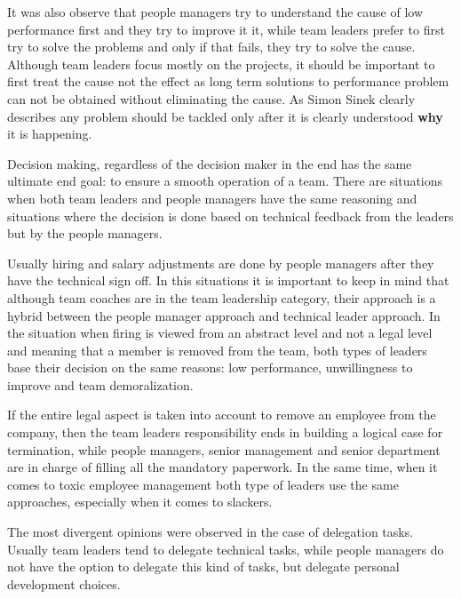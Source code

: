 It was also observe that people managers try to understand the cause of low performance first and they try to improve it it, while team leaders prefer to first try to solve the problems and only if that fails, they try to solve the cause. Although team leaders focus mostly on the projects, it should be important to first treat the cause not the effect as long term solutions to performance problem can not be obtained without eliminating the cause. As Simon Sinek clearly describes \cite{why} any problem should be tackled only after it is clearly understood \textbf{why} it is happening.

Decision making, regardless of the decision maker in the end has the same ultimate end goal: to ensure a smooth operation of a team. There are situations when both team leaders and people managers have the same reasoning and situations where the decision is done based on technical feedback from the leaders but by the people managers.

 Usually hiring and salary adjustments are done by people managers after they have the technical sign off. In this situations it is important to keep in mind that although team coaches are in the team leadership category, their approach is a hybrid between the people manager approach and technical leader approach. In the situation when firing is viewed from an abstract level and not a legal level and meaning that a member is removed from the team, both types of leaders base their decision on the same reasons: low performance, unwillingness to improve and team demoralization. 
 
If the entire legal aspect is taken into account to remove an employee from the company, then the team leaders responsibility ends in building a logical case for termination, while people managers, senior management and senior department are in charge of filling all the mandatory paperwork. In the same time, when it comes to toxic employee management both type of leaders use the same approaches, especially when it comes to slackers.

The most divergent opinions were observed in the case of delegation tasks. Usually team leaders tend to delegate technical tasks, while people managers do not have the option to delegate this kind of tasks, but delegate personal development choices.